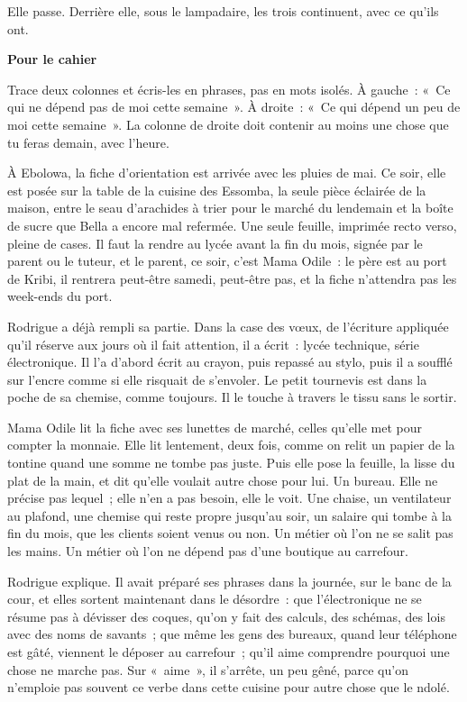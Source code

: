 \documentclass[10.5pt,twoside,openright]{book}
\newenvironment{pourcahier}[1]{\par\vspace{0.9em}\begin{tcolorbox}[colback=black!4,colframe=accent,boxrule=0pt,leftrule=2.2pt,arc=0pt,left=8pt,right=8pt,top=5pt,bottom=5pt]\small\textbf{#1}\par\smallskip}{\end{tcolorbox}\par}
\newcommand{\chapitre}[2]{\cleardoublepage\markright{#2}\thispagestyle{plain}\vspace*{2.2cm}{\noindent\color{accent}\fontsize{54}{54}\selectfont\bfseries #1}\par\vspace{0.5em}{\noindent\LARGE\bfseries #2\par}\vspace{1.6em}\noindent\ignorespaces}
\begin{document}
Elle passe. Derrière elle, sous le lampadaire, les trois continuent, avec ce qu’ils ont.

\begin{pourcahier}{Pour le cahier}
Trace deux colonnes et écris-les en phrases, pas en mots isolés. À gauche : « Ce qui ne dépend pas de moi cette semaine ». À droite : « Ce qui dépend un peu de moi cette semaine ». La colonne de droite doit contenir au moins une chose que tu feras demain, avec l’heure.
\end{pourcahier}


\chapitre{12}{Ce qu’on attend de toi}

À Ebolowa, la fiche d’orientation est arrivée avec les pluies de mai. Ce soir, elle est posée sur la table de la cuisine des Essomba, la seule pièce éclairée de la maison, entre le seau d’arachides à trier pour le marché du lendemain et la boîte de sucre que Bella a encore mal refermée. Une seule feuille, imprimée recto verso, pleine de cases. Il faut la rendre au lycée avant la fin du mois, signée par le parent ou le tuteur, et le parent, ce soir, c’est Mama Odile : le père est au port de Kribi, il rentrera peut-être samedi, peut-être pas, et la fiche n’attendra pas les week-ends du port.

Rodrigue a déjà rempli sa partie. Dans la case des vœux, de l’écriture appliquée qu’il réserve aux jours où il fait attention, il a écrit : lycée technique, série électronique. Il l’a d’abord écrit au crayon, puis repassé au stylo, puis il a soufflé sur l’encre comme si elle risquait de s’envoler. Le petit tournevis est dans la poche de sa chemise, comme toujours. Il le touche à travers le tissu sans le sortir.

Mama Odile lit la fiche avec ses lunettes de marché, celles qu’elle met pour compter la monnaie. Elle lit lentement, deux fois, comme on relit un papier de la tontine quand une somme ne tombe pas juste. Puis elle pose la feuille, la lisse du plat de la main, et dit qu’elle voulait autre chose pour lui. Un bureau. Elle ne précise pas lequel ; elle n’en a pas besoin, elle le voit. Une chaise, un ventilateur au plafond, une chemise qui reste propre jusqu’au soir, un salaire qui tombe à la fin du mois, que les clients soient venus ou non. Un métier où l’on ne se salit pas les mains. Un métier où l’on ne dépend pas d’une boutique au carrefour.

Rodrigue explique. Il avait préparé ses phrases dans la journée, sur le banc de la cour, et elles sortent maintenant dans le désordre : que l’électronique ne se résume pas à dévisser des coques, qu’on y fait des calculs, des schémas, des lois avec des noms de savants ; que même les gens des bureaux, quand leur téléphone est gâté, viennent le déposer au carrefour ; qu’il aime comprendre pourquoi une chose ne marche pas. Sur « aime », il s’arrête, un peu gêné, parce qu’on n’emploie pas souvent ce verbe dans cette cuisine pour autre chose que le ndolé.
\end{document}
